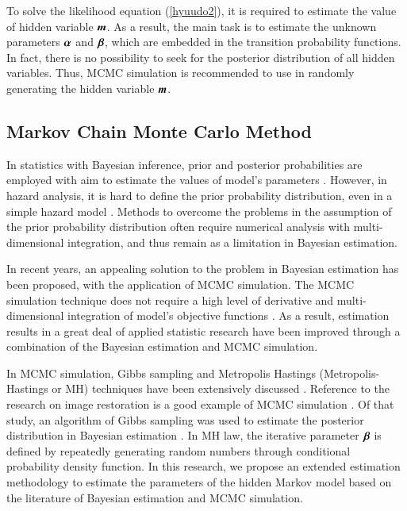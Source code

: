\documentclass[a4paper,oneside,onecolumn,preprint,10pt,authoryear]{elsarticle}
\begin{document}
To solve the likelihood equation (\ref{hyuudo2}), it is required to estimate the value of hidden variable $\mbox{\boldmath$m$}$. As a result, the main task is to estimate the unknown parameters $\mbox{\boldmath$\alpha$}$ and $\mbox{\boldmath$\beta$}$, which are embedded in the transition probability functions. In fact, there is no possibility to seek for the posterior distribution of all hidden variables. Thus, MCMC simulation is recommended to use in randomly generating the hidden variable $\mbox{\boldmath$m$}$.
\subsection{Markov Chain Monte Carlo Method}
\label{sec53}
In statistics with Bayesian inference, prior and posterior probabilities are employed with aim to estimate the values of model's parameters \citep{wago, jeffgill}. However, in hazard analysis, it is hard to define the prior probability distribution, even in a simple hazard model \citep{Ibrahim2001a}. Methods to overcome the problems in the assumption of the prior probability distribution often require numerical analysis with multi-dimensional integration, and thus remain as a limitation in Bayesian estimation.

In recent years, an appealing solution to the problem in Bayesian estimation has been proposed, with the application of MCMC simulation. The MCMC simulation technique does not require a high level of derivative and multi-dimensional integration of model's objective functions \citep{wago, jeffgill}. As a result, estimation results in a great deal of applied statistic research have been improved through a combination of the Bayesian estimation and MCMC simulation.

In MCMC simulation, Gibbs sampling and Metropolis Hastings (Metropolis-Hastings or MH) techniques have been extensively discussed \citep{wago, jeffgill}. Reference to the research on image restoration is a good example of MCMC simulation \citep{geman84}. Of that study, an algorithm of Gibbs sampling was used to estimate the posterior distribution in Bayesian estimation \citep{gibbs2}. In MH law, the iterative parameter $\mbox{\boldmath$\beta$}$ is defined by repeatedly generating random numbers through  conditional probability density function. In this research, we propose an extended estimation methodology to estimate the parameters of the hidden Markov model based on the literature of Bayesian estimation and MCMC simulation.
\end{document}
